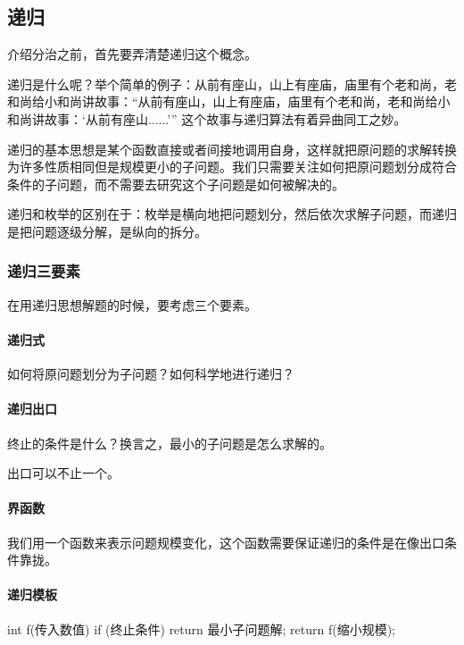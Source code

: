 
\subsection{递归}

介绍分治之前，首先要弄清楚递归这个概念。

递归是什么呢？举个简单的例子：从前有座山，山上有座庙，庙里有个老和尚，老和尚给小和尚讲故事：“从前有座山，山上有座庙，庙里有个老和尚，老和尚给小和尚讲故事：‘从前有座山......’” 这个故事与递归算法有着异曲同工之妙。

递归的基本思想是某个函数直接或者间接地调用自身，这样就把原问题的求解转换为许多性质相同但是规模更小的子问题。我们只需要关注如何把原问题划分成符合条件的子问题，而不需要去研究这个子问题是如何被解决的。

递归和枚举的区别在于：枚举是横向地把问题划分，然后依次求解子问题，而递归是把问题逐级分解，是纵向的拆分。

\subsubsection{递归三要素}

在用递归思想解题的时候，要考虑三个要素。

\paragraph{递归式}

如何将原问题划分为子问题？如何科学地进行递归？

\paragraph{递归出口}

终止的条件是什么？换言之，最小的子问题是怎么求解的。

出口可以不止一个。

\paragraph{界函数}

我们用一个函数来表示问题规模变化，这个函数需要保证递归的条件是在像出口条件靠拢。

\paragraph{递归模板}

\begin{cppcode}
int f(传入数值) {
  if (终止条件) return 最小子问题解;
  return f(缩小规模);
}
\end{cppcode}

